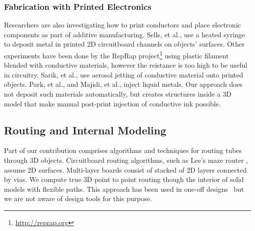 \subsubsection{Fabrication with Printed Electronics}
Researchers are also investigating how to print conductors and place electronic components as part of additive manufacturing.  Sells, et al., \cite{Sells-reprap} use a heated syringe to deposit metal in printed 2D circuitboard channels on objects' surfaces.  Other experiments have been done by the RepRap project\footnote{\url{http://reprap.org}} using plastic filament blended with conductive materials, however the reistance is too high to be useful in circuitry.  Sarik, et al., \cite{Sarik-tracebrush} use aerosol jetting of conductive material onto printed objects.  Park, et al., \cite{Park-microchannels} and Majidi, et al., \cite{Majidi-curvature} inject liquid metals.   Our approach does not deposit such materials automatically, but creates structures inside a 3D model that make manual post-print injection of conductive ink possible.

\subsection{Routing and Internal Modeling}
Part of our contribution comprises algorithms and techniques for routing tubes through 3D objects.
Circuitboard routing algorithms, such as Lee's maze router \cite{Lee-maze}, assume 2D surfaces. Multi-layer boards consist of stacked of 2D layers connected by vias. We compute true 3D point to point routing though the interior of solid models with flexible paths. This approach has been used in one-off designs~\cite{Navarrette-gps} but we are not aware of design tools for this purpose.


